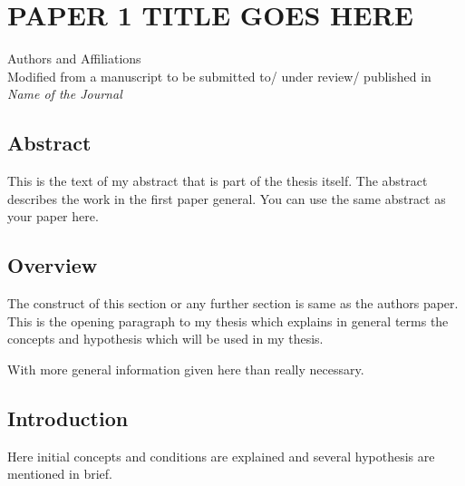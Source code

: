 \chapter{\MakeUppercase{Paper 1 Title Goes Here}}
\label{polymer_fibers}

\begin{center}
    Authors and Affiliations \\
    Modified from a manuscript to be submitted to/ under review/ published in \textit{Name of the Journal}
\end{center}

\section{Abstract}
This is the text of my abstract that is part of the thesis itself.
The abstract describes the work in the first paper general. You can use the same abstract as your paper here.



\section{Overview}

The  construct of this section or any further section is same as the authors paper.
This is the opening paragraph to my thesis which
explains in general terms the concepts and hypothesis
which will be used in my thesis.

With more general information given here than really
necessary.

\section{Introduction}

Here initial concepts and conditions are explained and
several hypothesis are mentioned in brief.

